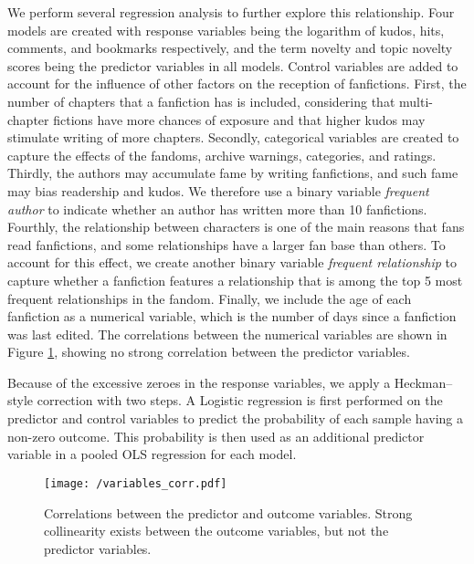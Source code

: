 \documentclass[letterpaper]{article} %
\begin{document}
We perform several regression analysis to further explore this relationship. Four models are created with response variables being the logarithm of kudos, hits, comments, and bookmarks respectively, and the term novelty and topic novelty scores being the predictor variables in all models. Control variables are added to account for the influence of other factors on the reception of fanfictions. First, the number of chapters that a fanfiction has is included, considering that multi-chapter fictions have more chances of exposure and that higher kudos may stimulate writing of more chapters. Secondly, categorical variables are created to capture the effects of the fandoms, archive warnings, categories, and ratings. Thirdly, the authors may accumulate fame by writing fanfictions, and such fame may bias readership and kudos. We therefore use a binary variable \emph{frequent author} to indicate whether an author has written more than 10 fanfictions. Fourthly, the relationship between characters is one of the main reasons that fans read fanfictions, and some relationships have a larger fan base than others. To account for this effect, we create another binary variable \emph{frequent relationship} to capture whether a fanfiction features a relationship that is among the top 5 most frequent relationships in the fandom. Finally, we include the age of each fanfiction as a numerical variable, which is the number of days since a fanfiction was last edited. The correlations between the numerical variables are shown in Figure \ref{fig:corr}, showing no strong correlation between the predictor variables.

Because of the excessive zeroes in the response variables, we apply a Heckman--style correction with two steps. A Logistic regression is first performed on the predictor and control variables to predict the probability of each sample having a non-zero outcome. This probability is then used as an additional predictor variable in a pooled OLS regression for each model.

\begin{figure}
    \centering
          \texttt{[image: /variables\_corr.pdf]}
        \caption{Correlations between the predictor and outcome variables. Strong collinearity exists between the outcome variables, but not the predictor variables. }
        \label{fig:corr}
\end{figure}
\end{document}
